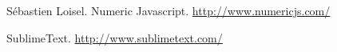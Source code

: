 \documentclass[12pt]{report}
\theoremstyle{definition}
\begin{document}
\begin{thebibliography}{99}
		Sébastien Loisel.
		Numeric Javascript. 
		\url{http://www.numericjs.com/}	
		
		SublimeText.
		\url{http://www.sublimetext.com/}
		

		
		
		
		
		
		
		
		
		
		
	\end{thebibliography}
	
	
\end{document}
